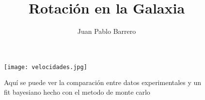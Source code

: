 \documentclass[12pt, letterpaper]{article}
\begin{document}
\title{Rotación en la Galaxia}

\author{Juan Pablo Barrero}

\maketitle

\begin{figure}[H] 
	\centering 
	\texttt{[image: velocidades.jpg]} 
	\caption{Aquí se puede ver la comparación entre datos experimentales y un fit bayesiano hecho con el metodo de monte carlo} 
	\label{fig:Curvas} 
\end{figure}
\end{document}
